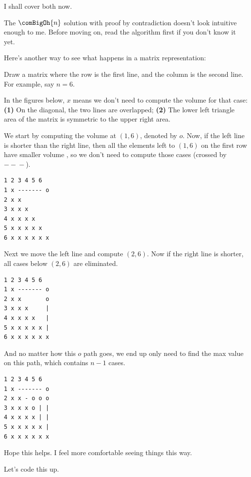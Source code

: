 I shall cover both now.

\rrsepline{}

The $\comBigOh{n}$ solution with proof by contradiction doesn't look
intuitive enough to me. Before moving on, read the algorithm first if you
don't know it yet.

Here's another way to see what happens in a matrix representation:

Draw a matrix where the row is the first line, and the column is the second
line. For example, say $n=6$.

In the figures below, $x$ means we don't need to compute the volume for that
case: \textbf{(1)} On the diagonal, the two lines are overlapped;
\textbf{(2)} The lower left triangle area of the matrix is symmetric to the
upper right area.

We start by computing the volume at $(1,6)$, denoted by $o$. Now, if the
left line is shorter than the right line, then all the elements left to
$(1,6)$ on the first row have smaller volume , so we don't need to compute those cases
(crossed by $-{}-{}-$).
\begin{lstlisting}[style=raygeneric]
  1 2 3 4 5 6
1 x ------- o
2 x x
3 x x x 
4 x x x x
5 x x x x x
6 x x x x x x
\end{lstlisting}
Next we move the left line and compute $(2,6)$. Now if the right line is
shorter, all cases below $(2,6)$ are eliminated. 
\begin{lstlisting}[style=raygeneric]
  1 2 3 4 5 6
1 x ------- o
2 x x       o
3 x x x     |
4 x x x x   |
5 x x x x x |
6 x x x x x x
\end{lstlisting}
And no matter how this $o$ path goes, we end up only need to find the max
value on this path, which contains $n-1$ cases.
\begin{lstlisting}[style=raygeneric]
  1 2 3 4 5 6
1 x ------- o
2 x x - o o o
3 x x x o | |
4 x x x x | |
5 x x x x x |
6 x x x x x x
\end{lstlisting}
Hope this helps. I feel more comfortable seeing things this way.

Let's code this up.


